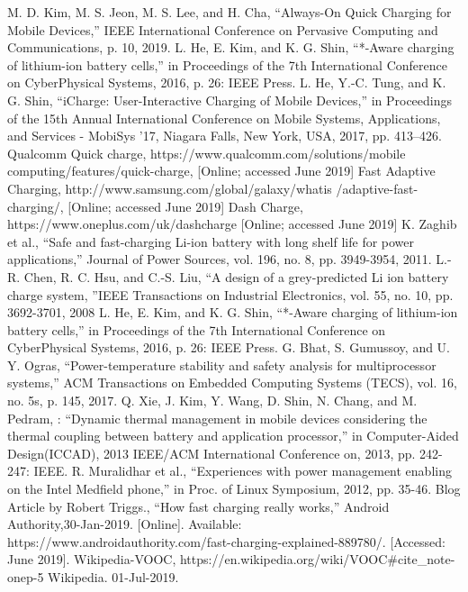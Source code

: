 \documentclass[conference]{IEEEtran}
\begin{document}
\begin{thebibliography}{00}
 M. D. Kim, M. S. Jeon, M. S. Lee, and H. Cha, “Always-On Quick Charging for Mobile Devices,” IEEE International Conference on Pervasive Computing and Communications, p. 10, 2019.
 L. He, E. Kim, and K. G. Shin, “*-Aware charging of lithium-ion battery cells,” in Proceedings of the 7th International Conference on CyberPhysical Systems, 2016, p. 26: IEEE Press.
 L. He, Y.-C. Tung, and K. G. Shin, “iCharge: User-Interactive Charging of Mobile Devices,” in Proceedings of the 15th Annual International Conference on Mobile Systems, Applications, and Services  - MobiSys ’17, Niagara Falls, New York, USA, 2017, pp. 413–426.
 Qualcomm Quick charge, https://www.qualcomm.com/solutions/mobile
computing/features/quick-charge, [Online; accessed June 2019] 
 Fast Adaptive Charging, http://www.samsung.com/global/galaxy/whatis
/adaptive-fast-charging/, [Online; accessed June 2019]
 Dash Charge, https://www.oneplus.com/uk/dashcharge [Online; accessed June 2019]
 K. Zaghib et al., “Safe and fast-charging Li-ion battery with long shelf life for power applications,” Journal of Power Sources, vol. 196, no. 8, pp. 3949-3954, 2011. 
 L.-R. Chen, R. C. Hsu, and C.-S. Liu, “A design of a grey-predicted Li ion battery charge system, ”IEEE Transactions on Industrial Electronics, vol. 55, no. 10, pp. 3692-3701, 2008
 L. He, E. Kim, and K. G. Shin, “*-Aware charging of lithium-ion battery cells,” in Proceedings of the 7th International Conference on CyberPhysical Systems, 2016, p. 26: IEEE Press. 
 G. Bhat, S. Gumussoy, and U. Y. Ogras, “Power-temperature stability and safety analysis for multiprocessor systems,” ACM Transactions on Embedded Computing Systems (TECS), vol. 16, no. 5s, p. 145, 2017.
 Q. Xie, J. Kim, Y. Wang, D. Shin, N. Chang, and M. Pedram, : “Dynamic thermal management in mobile devices considering the thermal coupling between battery and application processor,” in Computer-Aided Design(ICCAD), 2013 IEEE/ACM International Conference on, 2013, pp. 242-247: IEEE. 
 R. Muralidhar et al., “Experiences with power management enabling on the Intel Medfield phone,” in Proc. of Linux Symposium, 2012, pp. 35-46. 
 Blog Article by Robert Triggs., “How fast charging really works,” Android Authority,30-Jan-2019. [Online]. Available:
https://www.androidauthority.com/fast-charging-explained-889780/. 
[Accessed: June 2019].
 Wikipedia-VOOC, https://en.wikipedia.org/wiki/VOOC\#cite\_note-onep-5 Wikipedia. 01-Jul-2019.

\end{thebibliography}
\end{document}
